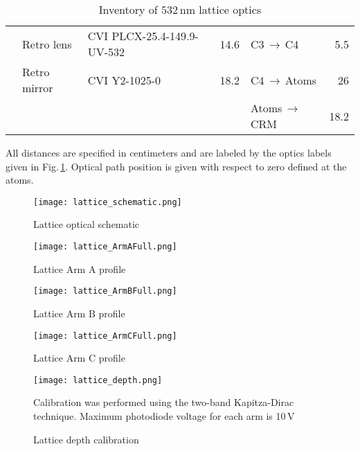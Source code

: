 \begin{table}[]
{{\begin{tabular}{@{}|c|llr|lr|@{}}
 & Retro lens & CVI PLCX-25.4-149.9-UV-532 & 14.6 & C3$\,\rightarrow\,$C4 & 5.5 \\
 & Retro mirror & CVI Y2-1025-0 & 18.2 & C4$\,\rightarrow\,$Atoms & 26 \\
 &  &  &  & Atoms$\,\rightarrow\,$CRM & 18.2 \\ \bottomrule
\end{tabular}%
}}
\caption{Inventory of $532\,\text{nm}$ lattice optics}{All distances are specified in centimeters and are labeled by the optics labels given in Fig.\,\ref{fig:532schematic}. Optical path position is given with respect to zero defined at the atoms.}
\label{tab:532sys}
\end{table}

	\begin{figure} 
		\centerline{
		\texttt{[image: lattice\_schematic.png]}}
		\caption{Lattice optical schematic}
		\label{fig:532schematic}
	\end{figure}
	
	\begin{figure} 
		\centerline{
		\texttt{[image: lattice\_ArmAFull.png]}}
		\caption{Lattice Arm A profile}
		\label{fig:532armAProfile}
	\end{figure}
	
	\begin{figure} 
		\centerline{
		\texttt{[image: lattice\_ArmBFull.png]}}
		\caption{Lattice Arm B profile}
		\label{fig:532armBProfile}
	\end{figure}
	
	\begin{figure} 
		\centerline{
		\texttt{[image: lattice\_ArmCFull.png]}}
		\caption{Lattice Arm C profile}
		\label{fig:532armCProfile}
	\end{figure}
	
	\begin{figure} 
		\centerline{
		\texttt{[image: lattice\_depth.png]}}
		\caption{Lattice depth calibration}{Calibration was performed using the two-band Kapitza-Dirac technique. Maximum photodiode voltage for each arm is 10\,V}
		\label{fig:latDepth}
	\end{figure}

\pagebreak
